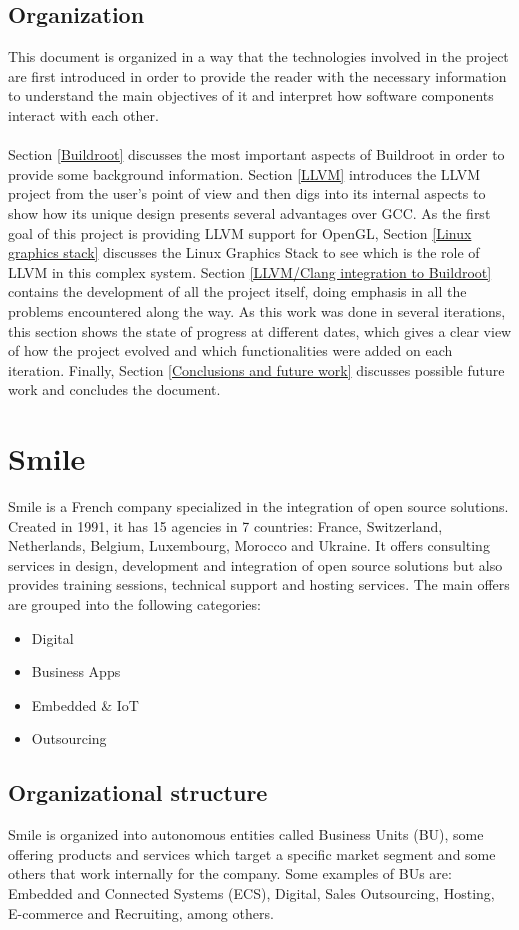 \documentclass[12pt,a4paper,oneside]{article}
\begin{document}
\subsection{Organization}
This document is organized in a way that the technologies involved in the
project are first introduced in order to provide the reader with the necessary
information to understand the main objectives of it and interpret how software
components interact with each other.\\\\
Section \ref{Buildroot} discusses the most
important aspects of Buildroot in order to provide some background information.
Section \ref{LLVM} introduces the LLVM project from the user's point of view and
then digs into its internal aspects to show how its unique design presents
several advantages over GCC. As the first goal of this project is providing
LLVM support for OpenGL, Section \ref{Linux graphics stack} discusses the
Linux Graphics Stack to see which is the role of LLVM in this complex system.
Section \ref{LLVM/Clang integration to Buildroot} contains the development of
all the project itself, doing emphasis in all the problems encountered along
the way. As this work was done in several iterations, this section shows the
state of progress at different dates, which gives a clear view of how the
project evolved and which functionalities were added on each iteration. Finally,
Section \ref{Conclusions and future work} discusses possible future work and
concludes the document.

\newpage
\section{Smile}
Smile is a French company specialized in the integration of open source
solutions. Created in 1991, it has 15 agencies in 7 countries: France,
Switzerland, Netherlands, Belgium, Luxembourg, Morocco and Ukraine. It offers
consulting services in design, development and integration of open source
solutions but also provides training sessions, technical support and hosting
services. The main offers are grouped into the following categories:
\begin{itemize}
  \item Digital
  \item Business Apps
  \item Embedded \& IoT
  \item Outsourcing
\end{itemize}

\subsection{Organizational structure}
Smile is organized into autonomous entities called Business Units (BU), some
offering products and services which target a specific market segment and
some others that work internally for the company. Some examples of BUs are:
Embedded and Connected Systems (ECS), Digital, Sales Outsourcing, Hosting,
E-commerce and Recruiting, among others.
\end{document}
